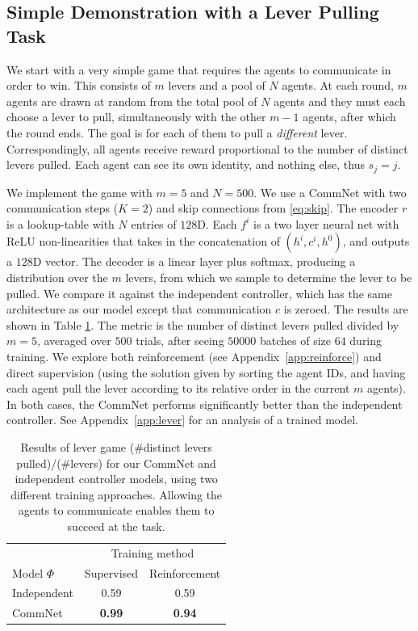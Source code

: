\documentclass{article}
\newcommand{\append}[1]{Appendix~\ref{app:#1}}
\begin{document}
\vspace{-2mm}
\subsection{Simple Demonstration with a Lever Pulling Task}
\vspace{-2mm}
We start with a very simple game that requires the agents to
communicate in order to win.  This consists of $m$ levers and a pool
of $N$ agents. At each round, $m$ agents are drawn at random from the total pool of $N$ agents
and they
must each choose a lever to pull, simultaneously with the other $m-1$
agents, after which the round ends. The goal is for each of them to pull a {\em different}
lever. Correspondingly, all agents receive reward proportional to the
number of distinct levers pulled. Each agent can see its own identity,
and nothing else, thus $s_j = j$. 

We implement the game
with $m=5$ and $N=500$.  We use a CommNet with two communication
steps ($K=2$) and skip connections from \eqref{eq:skip}.  The encoder $r$ is a
lookup-table with $N$ entries of $128$D.  Each $f^i$ is a
two layer neural net with ReLU non-linearities that takes in the
concatenation of $(h^i,c^i,h^0)$, and outputs a $128$D
vector.  The decoder is a linear layer plus softmax, producing a
distribution over the $m$ levers, from which we sample to determine the
lever to be pulled. We compare it against the independent controller, 
which has the same architecture as our model except that communication $c$ is zeroed.
The results are shown in Table \ref{tab:levers}. The metric is the
number of distinct levers pulled divided by $m=5$, averaged over $500$
trials, after seeing $50000$ batches of size $64$ during training. We
explore both reinforcement (see \append{reinforce}) and direct supervision
(using the solution given by sorting the agent IDs, and having each agent pull the lever according to its relative order in the current $m$ agents). In both
cases, the
CommNet performs significantly better than the independent controller. 
See \append{lever} for an analysis of a trained model.

\begin{table}[h]
\small
\center
\begin{tabular}{|l|c|c|} 
\hline
                                 & \multicolumn{2}{|c|}{Training method}         \\
Model $\Phi$       & Supervised & Reinforcement \\ \hline
Independent  &  0.59 & 0.59 \\ \hline
CommNet      & \textbf{0.99} &  \textbf{0.94} \\  \hline
\end{tabular}
\caption{
Results of lever game (\#distinct levers
  pulled)/(\#levers) for our CommNet and independent controller models,
  using two different training approaches. Allowing the agents to
  communicate enables them to succeed at the task. 
\vspace{-2mm}
  }
\label{tab:levers}
\end{table}
\end{document}
